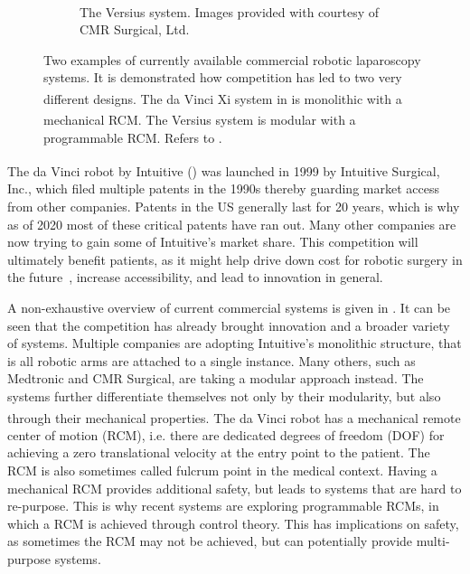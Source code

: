 \begin{figure}[tb]
\begin{subfigure}[b]{0.49\textwidth}
        \caption{The Versius\textsuperscript{\textregistered} system. Images provided with courtesy of  CMR Surgical, Ltd.}
        \label{in:fig:versius}
    \end{subfigure}
    \caption{Two examples of currently available commercial robotic laparoscopy systems. It is demonstrated how competition has led to two very different designs. The da Vinci\textsuperscript{\textregistered} Xi system in  is monolithic with a mechanical RCM. The Versius\textsuperscript{\textregistered} system is modular with a programmable RCM. Refers to .}
    \label{in:fig:surgical_systems}
\end{figure}

The da Vinci\textsuperscript{\textregistered} robot by Intuitive () was launched in 1999 by Intuitive Surgical, Inc., which filed multiple patents in the 1990s thereby guarding market access from other companies. Patents in the US generally last for 20 years, which is why as of 2020 most of these critical patents have ran out. Many other companies are now trying to gain some of Intuitive's market share. This competition will ultimately benefit patients, as it might help drive down cost for robotic surgery in the future~\cite{patel2021can}, increase accessibility, and lead to innovation in general. 

A non-exhaustive overview of current commercial systems is given in . It can be seen that the competition has already brought innovation and a broader variety of systems. Multiple companies are adopting Intuitive's monolithic structure, that is all robotic arms are attached to a single instance. Many others, such as Medtronic and CMR Surgical, are taking a modular approach instead. The systems further differentiate themselves not only by their modularity, but also through their mechanical properties. The da Vinci\textsuperscript{\textregistered} robot has a mechanical remote center of motion (RCM), i.e. there are dedicated degrees of freedom (DOF) for achieving a zero translational velocity at the entry point to the patient. The RCM is also sometimes called fulcrum point in the medical context. Having a mechanical RCM provides additional safety, but leads to systems that are hard to re-purpose. This is why recent systems are exploring programmable RCMs, in which a RCM is achieved through control theory. This has implications on safety, as sometimes the RCM may not be achieved, but can potentially provide multi-purpose systems. 

